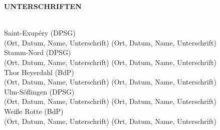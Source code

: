 \begin{Large}
    \textbf{UNTERSCHRIFTEN}
\end{Large}
\\

Saint-Exupéry (DPSG)
\\
(Ort, Datum, Name, Unterschrift) (Ort, Datum, Name, Unterschrift)
\\

Stamm-Nord (DPSG)
\\
(Ort, Datum, Name, Unterschrift) (Ort, Datum, Name, Unterschrift)
\\

Thor Heyerdahl (BdP)
\\
(Ort, Datum, Name, Unterschrift) (Ort, Datum, Name, Unterschrift)
\\

Ulm-Söflingen (DPSG)
\\
(Ort, Datum, Name, Unterschrift) (Ort, Datum, Name, Unterschrift)
\\

Weiße Rotte (BdP)
\\
(Ort, Datum, Name, Unterschrift) (Ort, Datum, Name, Unterschrift)
